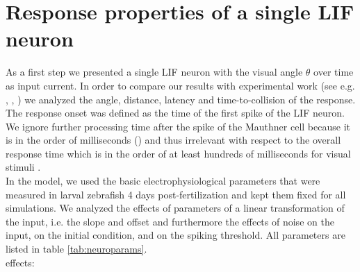 \documentclass[a4paper,10pt,hidelinks]{scrreprt}
\begin{document}
	\section{Response properties of a single LIF neuron}
	As a first step we presented a single LIF neuron with the visual angle 
	$\theta$ over time as input current.
	In order to compare our results with experimental work (see e.g. 
	\cite{Bhattacharyya2017}, \cite{Temizer2015}, \cite{Dunn2016}) we analyzed 
	the angle, distance, latency and time-to-collision of the response.
	The response onset was defined as the time of the first spike of the LIF neuron.
	We ignore further processing time after the spike of the Mauthner cell 
	because it is in the order of milliseconds (\cite{Preuss2003}) and thus 
	irrelevant with respect to the overall response time which is in the order 
	of at least hundreds of milliseconds for visual stimuli 
	\citep{Preuss2006}.\\
	In the model, we used the basic electrophysiological parameters that were measured in larval zebrafish 4 days post-fertilization \citep{Koyama2016} and kept them fixed for all simulations.
	We analyzed the effects of parameters of a linear transformation of the input, i.e. the slope and offset and furthermore the effects of noise on the input, on the initial condition, and on the spiking threshold.
	All parameters are listed in table \ref{tab:neuroparams}.\\
	effects:
\end{document}
